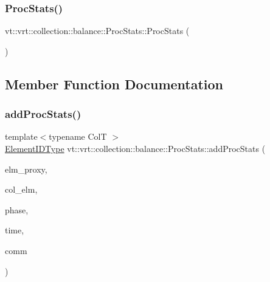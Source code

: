 \subsubsection{\texorpdfstring{Proc\+Stats()}{ProcStats()}}
{\footnotesize\ttfamily vt\+::vrt\+::collection\+::balance\+::\+Proc\+Stats\+::\+Proc\+Stats (\begin{DoxyParamCaption}{ }\end{DoxyParamCaption})\hspace{0.3cm}{\ttfamily [default]}}



\subsection{Member Function Documentation}
\mbox{\label{structvt_1_1vrt_1_1collection_1_1balance_1_1_proc_stats_ae9ec0e9f6af7d5e84c2260170a56c611}} 
\subsubsection{\texorpdfstring{add\+Proc\+Stats()}{addProcStats()}}
{\footnotesize\ttfamily template$<$typename ColT $>$ \\
\hyperlink{namespacevt_1_1vrt_1_1collection_1_1balance_a14c8d2c972f2913aa3f1636e5be0a120}{Element\+I\+D\+Type} vt\+::vrt\+::collection\+::balance\+::\+Proc\+Stats\+::add\+Proc\+Stats (\begin{DoxyParamCaption}\item[{\hyperlink{namespacevt_1_1vrt_a620a5c8c59d13e513f690c74b4af516f}{Virtual\+Elm\+Proxy\+Type}$<$ ColT $>$ const \&}]{elm\+\_\+proxy,  }\item[{ColT $\ast$}]{col\+\_\+elm,  }\item[{\hyperlink{namespacevt_a46ce6733d5cdbd735d561b7b4029f6d7}{Phase\+Type} const \&}]{phase,  }\item[{\hyperlink{namespacevt_a876a9d0cd5a952859c72de8a46881442}{Time\+Type} const \&}]{time,  }\item[{\hyperlink{namespacevt_1_1vrt_1_1collection_1_1balance_aa50d4cbbfa3c643e7303fc6e08f411fb}{Comm\+Map\+Type} const \&}]{comm }\end{DoxyParamCaption})}

